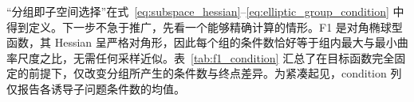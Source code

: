 “分组即子空间选择”在式~\eqref{eq:subspace_hessian}--\eqref{eq:elliptic_group_condition} 中得到定义。下一步不急于推广，先看一个能够精确计算的情形。F1 是对角椭球型函数，其 Hessian 呈严格对角形，因此每个组的条件数恰好等于组内最大与最小曲率尺度之比，无需任何采样近似。表~\ref{tab:f1_condition} 汇总了在目标函数完全固定的前提下，仅改变分组所产生的条件数与终点差异。为紧凑起见，condition 列仅报告各诱导子问题条件数的均值。
